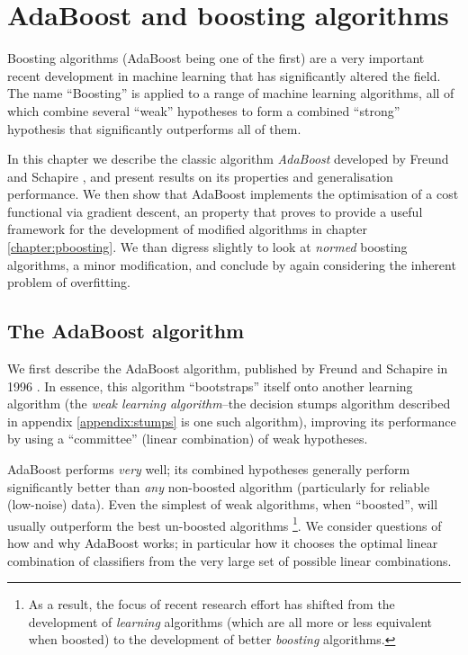 

\chapter{AdaBoost and boosting algorithms}
\label{chapter:boosting}

Boosting algorithms (AdaBoost being one of the first) are a very
important recent development in machine learning that has
significantly altered the field.  The name ``Boosting'' is applied to
a range of  machine learning algorithms, all of which combine several
``weak'' hypotheses to form a combined ``strong'' hypothesis that
significantly outperforms all of them.

In this chapter we describe the classic algorithm \emph{AdaBoost}
developed by Freund and Schapire \cite{Freund96}, and present results
on its properties and generalisation performance.  We then show that
AdaBoost implements the optimisation of a cost functional via gradient
descent, an property that proves to provide a useful framework for the
development of modified algorithms in chapter \ref{chapter:pboosting}.
We than digress slightly to look at \emph{normed} boosting algorithms,
a minor modification, and conclude by again considering the inherent
problem of overfitting.

\section{The AdaBoost algorithm}

We first describe the AdaBoost algorithm, published by Freund and
Schapire in 1996 \cite{Freund96}.  In essence, this algorithm 
``bootstraps'' itself onto another learning algorithm (the \emph{weak
learning algorithm}--the decision stumps algorithm described in
appendix \ref{appendix:stumps} is one such algorithm), improving its
performance by using a ``committee'' (linear combination) of weak
hypotheses.

AdaBoost performs \emph{very} well; its combined hypotheses generally
perform significantly better than \emph{any} non-boosted algorithm
(particularly for reliable (low-noise) data).  Even the simplest of
weak algorithms, when ``boosted'', will usually outperform the best
un-boosted algorithms%
\footnote{As a result, the focus of recent research effort has shifted
from the development of \emph{learning} algorithms (which are all more 
or less equivalent when boosted) to the development of better
\emph{boosting} algorithms.}.
We consider questions of how and why AdaBoost works; in particular how
it chooses the optimal linear combination of classifiers from the very
large set of possible linear combinations. 

